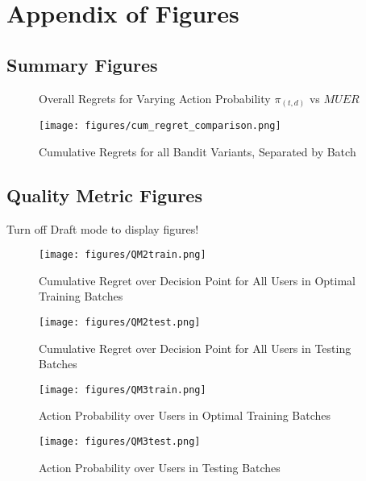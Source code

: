 \chapter{Appendix of Figures}
\label{AppendixA}

\section{Summary Figures}

\begin{figure}[h!]
\caption{Overall Regrets for Varying Action Probability $\pi_{(t,d)}$ vs $MUER$}
\label{RandomActionVsProbability}
\end{figure}


\begin{figure}[H]
\texttt{[image: figures/cum\_regret\_comparison.png]}%
\caption{Cumulative Regrets for all Bandit Variants, Separated by Batch}
\label{Cumulative Regrets for all Bandit Variants, Separated by Batch}
\end{figure}


\section{Quality Metric Figures}
\label{Quality Metric Figures}

	\ifdraft
	Turn off Draft mode to display figures!
	\else

	\begin{figure}[H]
	\texttt{[image: figures/QM2train.png]}%
	\caption{Cumulative Regret over Decision Point for All Users in Optimal Training Batches}
	\label{QM2train}
	\end{figure}

	\begin{figure}[H]
	\texttt{[image: figures/QM2test.png]}%
	\caption{Cumulative Regret over Decision Point for All Users in Testing Batches}
	\label{QM2test}
	\end{figure}

	\begin{figure}[H]
	\texttt{[image: figures/QM3train.png]}%
	\caption{Action Probability over Users in Optimal Training Batches}
	\label{QM3train}
	\end{figure}

	\begin{figure}[H]
	\texttt{[image: figures/QM3test.png]}%
	\caption{Action Probability over Users in Testing Batches}
	\label{QM3test}
	\end{figure}

